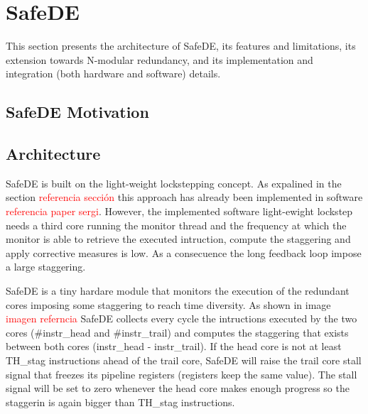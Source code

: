 
\chapter{SafeDE} %

This section presents the architecture of SafeDE, its features
and limitations, its extension towards N-modular redundancy,
and its implementation and integration (both hardware and
software) details.

\label{Chapter3} %


\section{SafeDE Motivation}


\section{Architecture}

SafeDE is built on the light-weight lockstepping concept. As expalined in the section \textcolor{red}{referencia sección} this approach has already been implemented in software \textcolor{red}{referencia paper sergi}. However, the implemented software light-ewight lockstep needs a third core running the monitor thread and the frequency at which the monitor is able to retrieve the executed intruction, compute the staggering and apply corrective measures is low. As a consecuence the long feedback loop impose a large staggering. 

SafeDE is a tiny hardare module that monitors the execution of the redundant cores imposing some staggering to reach time diversity.  As shown in image \textcolor{red}{imagen referncia} SafeDE collects every cycle the intructions executed by the two cores (\#instr\_head and \#instr\_trail) and computes the staggering that exists between both cores (instr\_head - instr\_trail). If the head core is not at least TH\_stag instructions ahead of the trail core, SafeDE will raise the trail core stall signal that freezes its pipeline registers (registers keep the same value). The stall signal will be set to zero whenever the head core makes enough progress so the staggerin is again bigger than TH\_stag instructions.

